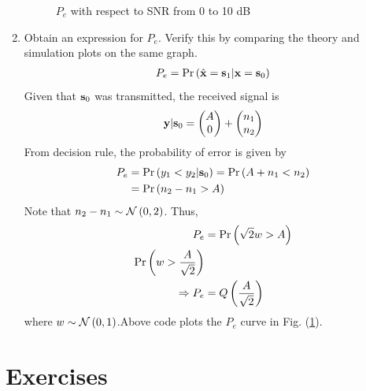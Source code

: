 \documentclass[10pt, a4paper]{article}
\begin{document}
\begin{enumerate}
\begin{figure}
        \caption{$P_e$ with respect to SNR from 0 to 10 dB}
        \label{fig:ber_snr_plot}
        \end{figure}
    \item
    Obtain an expression for $P_e$. Verify this by comparing the theory and simulation plots on the same graph.
    \\
    \solution 
    \begin{align}
    P_e = \Pr\left(\hat{\mathbf{x}} = \mathbf{s}_1|\mathbf{x} = \mathbf{s}_0\right)
    \end{align}
    Given that $\mathbf{s}_0$ was transmitted, the received signal is
    \begin{align}
    \mathbf{y}|\mathbf{s}_0 = \begin{pmatrix} A \\ 0 \end{pmatrix} + \begin{pmatrix} n_1 \\ n_2 \end{pmatrix}
    \end{align}
    From decision rule, the probability of error is given by 
    \begin{align}
    P_e &= \Pr\left(y_1 < y_2 |\mathbf{s}_0\right) = \Pr\left(A+n_1 < n_2\right)\\
    &= \Pr\left(n_2 - n_1 > A\right)
    \end{align}
    Note that $n_2 - n_1 \sim \mathcal{N}\left(0,2\right)$. Thus,
    \begin{align}
    P_e &= \Pr\left(\sqrt{2}w > A\right)\\
    \Pr\left(w > \dfrac{A}{\sqrt{2}}\right)\\
    \Rightarrow P_e &= Q\left(\frac{A}{\sqrt{2}}\right)
    \end{align}
    where $w \sim \mathcal{N}\left(0,1\right)$.Above code plots the $P_e$ curve in Fig. (\ref{fig:ber_snr_plot}).
    \end{enumerate}
\section{Exercises}
\end{document}
